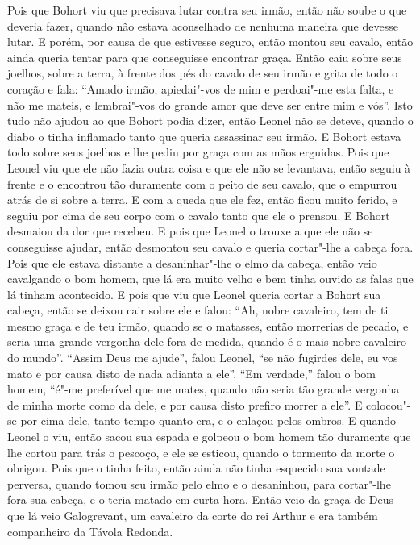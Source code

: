 Pois que Bohort viu que precisava lutar contra seu irmão, então não soube o que
deveria fazer, quando não estava aconselhado de nenhuma maneira que devesse
lutar. E porém, por causa de que estivesse seguro, então montou seu cavalo,
então ainda queria tentar para que conseguisse encontrar graça. Então caiu
sobre seus joelhos, sobre a terra, à frente dos pés do cavalo de seu irmão e
grita de todo o coração e fala: “Amado irmão, apiedai"-vos de mim e perdoai"-me
esta falta, e não me mateis, e lembrai"-vos do grande amor que deve ser entre
mim e vós”. Isto tudo não ajudou ao que Bohort podia dizer, então Leonel não se
deteve, quando o diabo o tinha inflamado tanto que queria assassinar seu irmão. 
E Bohort estava todo sobre seus joelhos e lhe pediu por graça com as
mãos erguidas. Pois que Leonel viu que ele não fazia outra coisa e que
ele não se levantava, então seguiu à frente e o encontrou tão duramente com o
peito de seu cavalo, que o empurrou atrás de si sobre a terra. E com a queda
que ele fez, então ficou muito ferido, e seguiu por cima de seu corpo com o
cavalo tanto que ele o prensou. E Bohort desmaiou da dor que recebeu. E pois
que Leonel o trouxe a que ele não se conseguisse ajudar, então desmontou seu
cavalo e queria cortar"-lhe a cabeça fora. Pois que ele estava distante a
desaninhar"-lhe o elmo da cabeça, então veio cavalgando o bom homem, que lá era
muito velho e bem tinha ouvido as falas que lá tinham acontecido. E pois que
viu que Leonel queria cortar a Bohort sua cabeça, então se deixou cair sobre
ele e falou: “Ah, nobre cavaleiro, tem de ti mesmo graça e de teu irmão, quando
se o matasses, então morrerias de pecado, e seria uma grande vergonha dele fora
de medida, quando é o mais nobre cavaleiro do mundo”. “Assim Deus me
ajude”, falou Leonel, “se não fugirdes dele, eu vos mato e por causa disto de
nada adianta a ele”. “Em verdade,” falou o bom homem, “é"-me preferível que me
mates, quando não seria tão grande vergonha de minha morte como da dele, e por
causa disto prefiro morrer a ele”. E colocou"-se por cima dele, tanto tempo
quanto era, e o enlaçou pelos ombros. E quando Leonel o viu, então sacou sua
espada e golpeou o bom homem tão duramente que lhe cortou para trás o pescoço,
e ele se esticou, quando o tormento da morte o obrigou. Pois que o tinha feito,
então ainda não tinha esquecido sua vontade perversa, quando tomou seu irmão
pelo elmo e o desaninhou, para cortar"-lhe fora sua cabeça, e o teria matado em
curta hora. Então veio da graça de Deus que lá veio Galogrevant, um cavaleiro
da corte do rei Arthur e era também companheiro da Távola Redonda.
